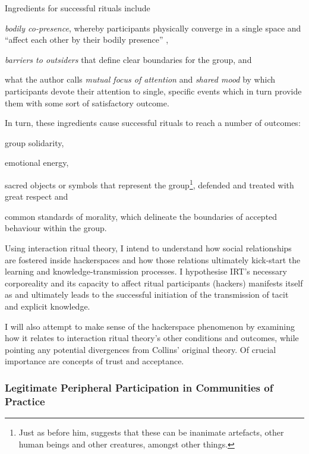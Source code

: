 Ingredients for successful rituals include
\begin{inparaenum}
  \item \textit{bodily co-presence}, whereby participants physically converge in a single space and ``affect each other by their bodily presence'' \citep[p.48]{collins04},
  \item \textit{barriers to outsiders} that define clear boundaries for the group, and
  \item what the author calls \textit{mutual focus of attention} and \textit{shared mood} by which participants devote their attention to single, specific events which in turn provide them with some sort of satisfactory outcome.
\end{inparaenum}

In turn, these ingredients cause successful rituals to reach a number of outcomes:
\begin{inparaenum}
  \item group solidarity,
  \item emotional energy,
  \item sacred objects or symbols that represent the group\footnote{Just as \citeauthor{goffman67} before him, \citeauthor{collins04} suggests that these can be inanimate artefacts, other human beings and other creatures, amongst other things.}, defended and treated with great respect and
  \item common standards of morality, which delineate the boundaries of accepted behaviour within the group.
\end{inparaenum}


Using interaction ritual theory, I intend to understand how social relationships are fostered inside hackerspaces and how those relations ultimately kick-start the learning and knowledge-transmission processes. I hypothesise IRT's necessary corporeality and its capacity to affect ritual participants (hackers) manifests itself as and ultimately leads to the successful initiation of the transmission of tacit and explicit knowledge.

I will also attempt to make sense of the hackerspace phenomenon by examining how it relates to interaction ritual theory's other conditions and outcomes, while pointing any potential divergences from Collins' original theory. Of crucial importance are concepts of trust and acceptance.

\subsubsection{Legitimate Peripheral Participation in Communities of Practice}

